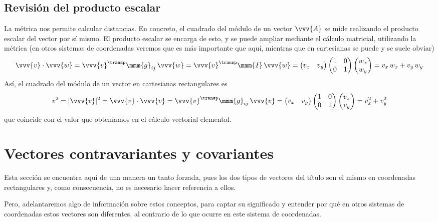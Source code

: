 \subsection{Revisión del producto escalar}
La métrica nos permite calcular distancias. En concreto, el cuadrado del módulo de un
vector $\vvv{A}$ se mide realizando el producto escalar del vector por sí mismo.
El producto escalar se encarga de esto, y se puede ampliar mediante el cálculo
matricial, utilizando la métrica (en otros sistemas de coordenadas veremos que es más
importante que aquí, mientras que en cartesianas se puede y se suele obviar)
\[
  \vvv{v}\cdot\vvv{w}
  = \vvv{v}^\transp \mmm{g}_{ij}\, \vvv{w}
  = \vvv{v}^\transp \mmm{I}\, \vvv{w}
  = \begin{pmatrix}
    v_x &  v_y
  \end{pmatrix}
  \begin{pmatrix}
    1 & 0\\
    0 & 1
  \end{pmatrix}
  \begin{pmatrix}
    w_x\\
    w_y
  \end{pmatrix}
  =
  v_x\,w_x + v_y\, w_y
\]
Así, el cuadrado del módulo de un vector en cartesianas rectangulares es
\[
  v^2
  =
  |\vvv{v}|^2
  =
  \vvv{v}\cdot\vvv{v}
  =
  \vvv{v}^\transp \mmm{g}_{ij}\, \vvv{v}
  =
  \begin{pmatrix}
  v_x &  v_y
\end{pmatrix}
\begin{pmatrix}
  1 & 0\\
  0 & 1
\end{pmatrix}
\begin{pmatrix}
  v_x\\
  v_y
\end{pmatrix}
=
v_x^2 + v_y^2
\]
que coincide con el valor que obteníamos en el cálculo vectorial elemental.


\section{Vectores contravariantes y covariantes}
Esta sección se encuentra aquí de una manera un tanto forzada, pues los dos
tipos de vectores del título son el mismo en coordenadas rectangulares y, como
consecuencia, no es necesario hacer referencia a ellos.

Pero, adelantaremos algo de información sobre estos conceptos, para captar su
significado y entender por qué en otros sistemas de coordenadas estos vectores
son diferentes, al contrario de lo que ocurre en este sistema de coordenadas.

